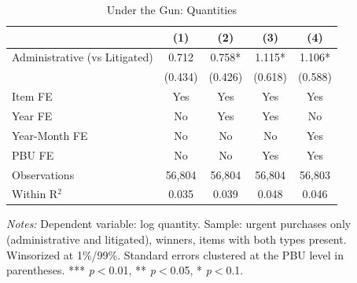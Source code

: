 \begin{table}[ht]
  \centering
  \caption{Under the Gun: Quantities}
  \label{tab:t1_utg_quantities}
  \small
  \begin{threeparttable}
  \begin{tabular}{lcccc}
    \hline\hline
    & (1) & (2) & (3) & (4) \\
    \hline
    Administrative (vs Litigated) & 0.712 & 0.758* & 1.115* & 1.106* \\
     & (0.434) & (0.426) & (0.618) & (0.588) \\[3pt]
    \hline
    Item FE & Yes & Yes & Yes & Yes \\
    Year FE & No & Yes & Yes & No \\
    Year-Month FE & No & No & No & Yes \\
    PBU FE & No & No & Yes & Yes \\
    Observations & 56,804 & 56,804 & 56,804 & 56,803 \\
    Within R$^2$ & 0.035 & 0.039 & 0.048 & 0.046 \\
    \hline\hline
  \end{tabular}
  \begin{tablenotes}
    \small
    \item \textit{Notes:} Dependent variable: log quantity. Sample: urgent purchases only (administrative and litigated), winners, items with both types present. Winsorized at 1\%/99\%. Standard errors clustered at the PBU level in parentheses. *** \textit{p}$<$0.01, ** \textit{p}$<$0.05, * \textit{p}$<$0.1.
  \end{tablenotes}
  \end{threeparttable}
\end{table}
